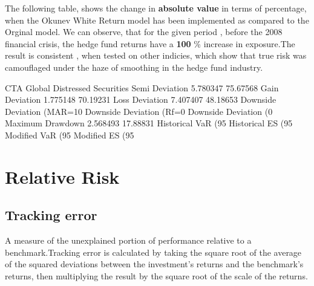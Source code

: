 \documentclass[12pt,letterpaper,english]{article}
\begin{document}
The following table, shows the change in \textbf{absolute value} in terms of percentage, when the Okunev White Return model has been implemented as compared to the Orginal model. We can observe, that for the given period , before the 2008 financial crisis, the hedge fund returns have a \textbf{100} \% increase in exposure.The result is consistent , when tested on other indicies, which show that true risk was camouflaged under the haze of smoothing in the hedge fund industry.


\begin{Schunk}
\begin{Soutput}
                             CTA Global Distressed Securities
Semi Deviation                 5.780347              75.67568
Gain Deviation                 1.775148              70.19231
Loss Deviation                 7.407407              48.18653
Downside Deviation (MAR=10%
Downside Deviation (Rf=0%
Downside Deviation (0%
Maximum Drawdown               2.568493              17.88831
Historical VaR (95%
Historical ES (95%
Modified VaR (95%
Modified ES (95%
\end{Soutput}
\end{Schunk}



\section{Relative Risk}

\subsection{Tracking error}

A measure of the unexplained portion of performance relative to a benchmark.Tracking error is calculated by taking the square root of the average of the squared deviations between the investment's returns and the benchmark's returns, then multiplying the result by the square root of the scale of the returns.

\end{document}
